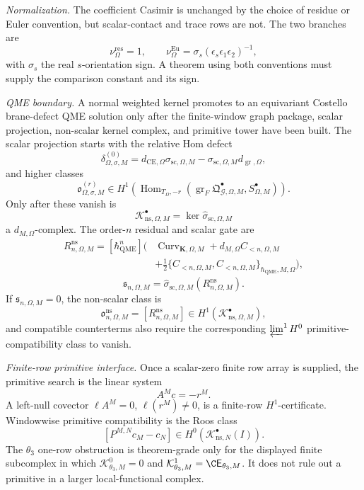 \begin{stmt}
  \emph{Normalization.} The coefficient Casimir is unchanged by the
  choice of residue or Euler convention, but scalar-contact and trace
  rows are not.  The two branches are
  \[
    \nu_\Omega^{\mathrm{res}}=1,\qquad
    \nu_\Omega^{\mathrm{Eu}}
    =
    \sigma_s(\epsilon_s\epsilon_1\epsilon_2)^{-1},
  \]
  with \(\sigma_s\) the real \(s\)-orientation sign.  A theorem using
  both conventions must supply the comparison constant and its sign.

  \emph{QME boundary.} A normal weighted kernel promotes to an
  equivariant Costello brane-defect QME solution only after the
  finite-window graph package, scalar projection, non-scalar kernel
  complex, and primitive tower have been built.  The scalar projection
  starts with the relative Hom defect
  \[
    \delta^{(0)}_{\Omega,\sigma,M}
    =
    d_{\mathrm{CE},\Omega}\sigma_{\mathrm{sc},\Omega,M}
    -\sigma_{\mathrm{sc},\Omega,M}d_{\operatorname{gr},\Omega},
  \]
  and higher classes
  \[
    \mathfrak o^{(r)}_{\Omega,\sigma,M}
    \in
    H^1\!\left(
      \operatorname{Hom}_{T_\Omega,-r}
      (\operatorname{gr}_{F}\mathfrak Q^\bullet_{\mathcal G,\Omega,M},
       S^\bullet_{\Omega,M})
    \right).
  \]
  Only after these vanish is
  \[
    \mathcal K^\bullet_{\mathrm{ns},\Omega,M}
    =
    \ker\widehat\sigma_{\mathrm{sc},\Omega,M}
  \]
  a \(d_{M,\Omega}\)-complex.  The order-\(n\) residual and scalar gate
  are
  \[
  \begin{aligned}
    R^{\mathrm{ns}}_{n,\Omega,M}
      =
    [\hbar_{\mathrm{QME}}^n]\bigl(
      &\operatorname{Curv}_{\mathbf K,\Omega,M}
      +d_{M,\Omega}C_{<n,\Omega,M}\\
      &+\frac12
      \{C_{<n,\Omega,M},C_{<n,\Omega,M}\}_{\hbar_{\mathrm{QME}},M,\Omega}
    \bigr),
  \end{aligned}
  \]
  \[
    \mathfrak s_{n,\Omega,M}
    =
    \widehat\sigma_{\mathrm{sc},\Omega,M}
    (R^{\mathrm{ns}}_{n,\Omega,M}).
  \]
  If \(\mathfrak s_{n,\Omega,M}=0\), the non-scalar class is
  \[
    \mathfrak o^{\mathrm{ns}}_{n,\Omega,M}
    =
    [R^{\mathrm{ns}}_{n,\Omega,M}]
    \in H^1(\mathcal K^\bullet_{\mathrm{ns},\Omega,M}),
  \]
  and compatible counterterms also require the corresponding
  \(\varprojlim^1H^0\) primitive-compatibility class to vanish.

  \emph{Finite-row primitive interface.} Once a scalar-zero finite row
  array is supplied, the primitive search is the linear system
  \[
    A^M c=-r^M.
  \]
  A left-null covector \(\ell A^M=0\), \(\ell(r^M)\ne0\), is a
  finite-row \(H^1\)-certificate.  Windowwise primitive compatibility is
  the Roos class
  \[
    [P^{M,N}c_M-c_N]\in
    H^0(\mathcal K^\bullet_{\mathrm{ns},N}(I)).
  \]
  The \(\theta_3\) one-row obstruction is theorem-grade only for the
  displayed finite subcomplex in which
  \(\mathcal K^0_{\theta_3,M}=0\) and
  \(\mathcal K^1_{\theta_3,M}=\C\mathsf E_{\theta_3,M}\).  It does not
  rule out a primitive in a larger local-functional complex.


\end{stmt}
